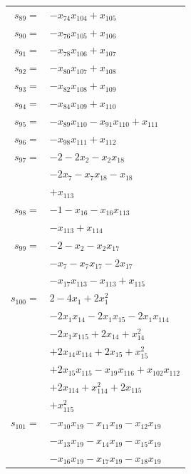 \begin{longtable}{@{}r@{\;}l@{}}
\(s_{89}=\) & \(\displaystyle -x_{74}x_{104} +x_{105}\) \\[3pt]
\(s_{90}=\) & \(\displaystyle -x_{76}x_{105} +x_{106}\) \\[3pt]
\(s_{91}=\) & \(\displaystyle -x_{78}x_{106} +x_{107}\) \\[3pt]
\(s_{92}=\) & \(\displaystyle -x_{80}x_{107} +x_{108}\) \\[3pt]
\(s_{93}=\) & \(\displaystyle -x_{82}x_{108} +x_{109}\) \\[3pt]
\(s_{94}=\) & \(\displaystyle -x_{84}x_{109} +x_{110}\) \\[3pt]
\(s_{95}=\) & \(\displaystyle -x_{89}x_{110} -x_{91}x_{110} +x_{111}\) \\[3pt]
\(s_{96}=\) & \(\displaystyle -x_{98}x_{111} +x_{112}\) \\[3pt]
\(s_{97}=\) & \(\displaystyle -2 -2x_{2} -x_{2}x_{18}\) \\
 & \(\displaystyle -2x_{7} -x_{7}x_{18} -x_{18}\) \\
 & \(\displaystyle +x_{113}\) \\[3pt]
\(s_{98}=\) & \(\displaystyle -1 -x_{16} -x_{16}x_{113}\) \\
 & \(\displaystyle -x_{113} +x_{114}\) \\[3pt]
\(s_{99}=\) & \(\displaystyle -2 -x_{2} -x_{2}x_{17}\) \\
 & \(\displaystyle -x_{7} -x_{7}x_{17} -2x_{17}\) \\
 & \(\displaystyle -x_{17}x_{113} -x_{113} +x_{115}\) \\[3pt]
\(s_{100}=\) & \(\displaystyle 2 -4x_{1} +2x_{1}^{2}\) \\
 & \(\displaystyle -2x_{1}x_{14} -2x_{1}x_{15} -2x_{1}x_{114}\) \\
 & \(\displaystyle -2x_{1}x_{115} +2x_{14} +x_{14}^{2}\) \\
 & \(\displaystyle +2x_{14}x_{114} +2x_{15} +x_{15}^{2}\) \\
 & \(\displaystyle +2x_{15}x_{115} -x_{19}x_{116} +x_{102}x_{112}\) \\
 & \(\displaystyle +2x_{114} +x_{114}^{2} +2x_{115}\) \\
 & \(\displaystyle +x_{115}^{2}\) \\[3pt]
\(s_{101}=\) & \(\displaystyle -x_{10}x_{19} -x_{11}x_{19} -x_{12}x_{19}\) \\
 & \(\displaystyle -x_{13}x_{19} -x_{14}x_{19} -x_{15}x_{19}\) \\
 & \(\displaystyle -x_{16}x_{19} -x_{17}x_{19} -x_{18}x_{19}\) \\

\end{longtable}
